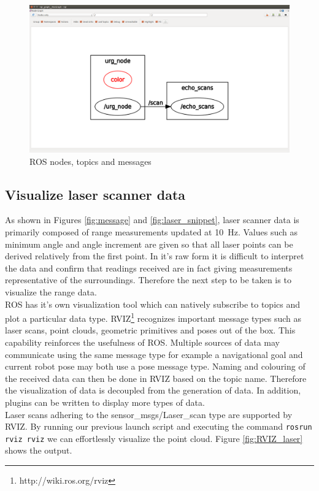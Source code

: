 \documentclass[capstone_report.tex]{subfiles}
\begin{document}
\begin{figure}[H]
    \centering
    \includegraphics[width=0.8\linewidth]{imgs/node_graph.png}
    \caption{ROS nodes, topics and messages}
    \label{fig:ROS}
\end{figure}

\subsection{Visualize laser scanner data}

As shown in Figures \ref{fig:message} and \ref{fig:laser_snippet}, laser scanner data is primarily composed of range measurements updated at \SI{10}{\hertz}.  Values such as minimum angle and angle increment are given so that all laser points can be derived relatively from the first point.  In it’s raw form it is difficult to interpret the data and confirm that readings received are in fact giving measurements representative of the surroundings.  Therefore the next step to be taken is to visualize the range data.\\

ROS has it’s own visualization tool which can natively subscribe to topics and plot a particular data type.  RVIZ\footnote{http://wiki.ros.org/rviz} recognizes important message types such as laser scans, point clouds, geometric primitives and poses out of the box.  This capability reinforces the usefulness of ROS.  Multiple sources of data may communicate using the same message type for example a navigational goal and current robot pose may both use a pose message type.  Naming and colouring of the received data can then be done in RVIZ based on the topic name.  Therefore the visualization of data is decoupled from the generation of data.  In addition, plugins can be written to display more types of data.\\

Laser scans adhering to the sensor\_msgs/Laser\_scan type are supported by RVIZ.  By running our previous launch script and executing the command \texttt{rosrun rviz rviz} we can effortlessly visualize the point cloud.  Figure \ref{fig:RVIZ_laser} shows the output.
\end{document}
